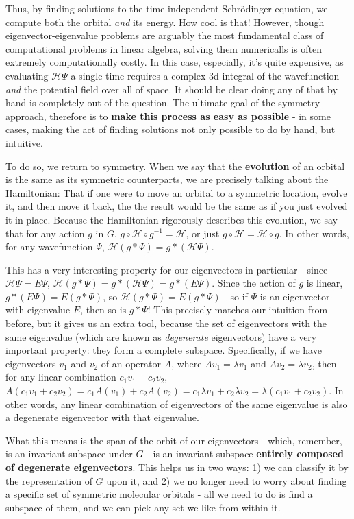 \documentclass{article}
\newcommand{\ham}{\mathcal{H}}
\begin{document}
Thus, by finding solutions to the time-independent Schr\"odinger equation, we compute both the orbital \textit{and} its energy. How cool is that! However, though eigenvector-eigenvalue problems are arguably the most fundamental class of computational problems in linear algebra, solving them numericalls is often extremely computationally costly. In this case, especially, it's quite expensive, as evaluating $\ham\Psi$ a single time requires a complex 3d integral of the wavefunction \textit{and} the potential field over all of space. It should be clear doing any of that by hand is completely out of the question. The ultimate goal of the symmetry approach, therefore is to \textbf{make this process as easy as possible} - in some cases, making the act of finding solutions not only possible to do by hand, but intuitive.

To do so, we return to symmetry. When we say that the \textbf{evolution} of an orbital is the same as its symmetric counterparts, we are precisely talking about the Hamiltonian: That if one were to move an orbital to a symmetric location, evolve it, and then move it back, the the result would be the same as if you just evolved it in place. Because the Hamiltonian rigorously describes this evolution, we say that for any action $g$ in $G$, $g\circ \ham\circ g^{-1} = \ham$, or just $g\circ\ham = \ham\circ g$. In other words, for any wavefunction $\Psi$, $\ham(g*\Psi) = g*(\ham\Psi)$. 

This has a very interesting property for our eigenvectors in particular - since $\ham\Psi = E\Psi$, $\ham(g*\Psi)=g*(\ham\Psi)=g*(E\Psi)$. Since the action of $g$ is linear, $g*(E\Psi) = E(g*\Psi)$, so $\ham(g*\Psi) = E(g*\Psi)$ - so if $\Psi$ is an eigenvector with eigenvalue $E$, then so is $g*\Psi$! This precisely matches our intuition from before, but it gives us an extra tool, because the set of eigenvectors with the same eigenvalue (which are known as \textit{degenerate} eigenvectors) have a very important property: they form a complete subspace. Specifically, if we have eigenvectors $v_1$ and $v_2$ of an operator $A$, where $Av_1 = \lambda v_1$ and $Av_2 = \lambda v_2$, then for any linear combination $c_1v_1 + c_2v_2$, $A(c_1v_1 + c_2v_2) = c_1A(v_1) + c_2A(v_2) = c_1\lambda v_1 + c_2\lambda v_2 = \lambda(c_1v_1 + c_2v_2)$. In other words, any linear combination of eigenvectors of the same eigenvalue is also a degenerate eigenvector with that eigenvalue.

What this means is the span of the orbit of our eigenvectors - which, remember, is an invariant subspace under $G$ - is an invariant subspace \textbf{entirely composed of degenerate eigenvectors}. This helps us in two ways: 1) we can classify it by the representation of $G$ upon it, and 2) we no longer need to worry about finding a specific set of symmetric molecular orbitals - all we need to do is find a subspace of them, and we can pick any set we like from within it.
\end{document}
